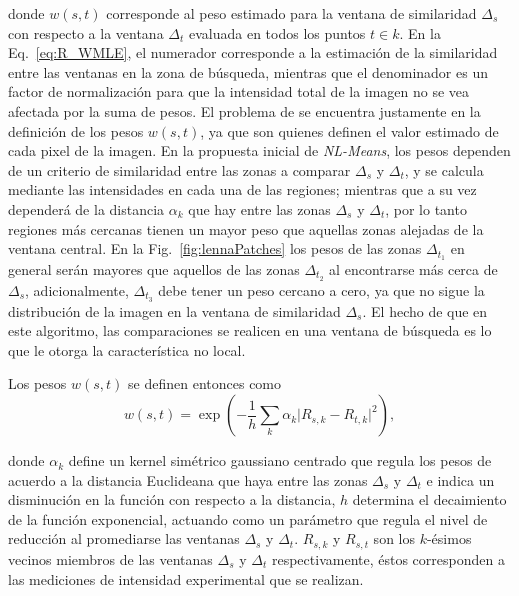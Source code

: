 \noindent donde $w(s,t)$ corresponde al peso estimado para la ventana de similaridad $\Delta_s$ con respecto a la ventana $\Delta_t$ evaluada en todos los puntos $t\in k$. En la Eq.~\ref{eq:R_WMLE}, el numerador corresponde a la estimación de la similaridad entre las ventanas en la zona de búsqueda, mientras que el denominador es un factor de normalización para que la intensidad total de la imagen no se vea afectada por la suma de pesos. El problema de \nlmeans se encuentra justamente en la definición de los pesos $w(s,t)$, ya que son quienes definen el valor estimado de cada pixel de la imagen. En la propuesta inicial de \textit{NL-Means}, los pesos dependen de un criterio de similaridad entre las zonas a comparar $\Delta_s$ y $\Delta_t$, y se calcula mediante las intensidades en cada una de las regiones; mientras que a su vez dependerá de la distancia $\alpha_k$ que hay entre las zonas $\Delta_s$ y $\Delta_t$, por lo tanto regiones más cercanas tienen un mayor peso que aquellas zonas alejadas de la ventana central. En la Fig.~\ref{fig:lennaPatches} los pesos de las zonas $\Delta_{t_1}$ en general serán mayores que aquellos de las zonas $\Delta_{t_2}$ al encontrarse más cerca de $\Delta_s$, adicionalmente, $\Delta_{t_3}$ debe tener un peso cercano a cero, ya que no sigue la distribución de la imagen en la ventana de similaridad $\Delta_s$.  El hecho de que en este algoritmo, las comparaciones se realicen en una ventana de búsqueda es lo que le otorga la característica no local.

Los pesos $w(s,t)$ se definen \cite{Baudes2005} entonces como
\begin{equation}
\label{eq:nlmeans_normal_w}
w(s,t) = \exp\left(-\frac{1}{h} \sum_k \alpha_k \lvert R_{s,k}-R_{t,k} \rvert^2 \right),
\end{equation}

\noindent donde $\alpha_k$ define un kernel simétrico gaussiano centrado que regula los pesos de acuerdo a la distancia Euclideana que haya entre las zonas $\Delta_s$ y $\Delta_t$ e indica un disminución en la función con respecto a la distancia, $h$ determina el decaimiento de la función exponencial, actuando como un parámetro que regula el nivel de reducción al promediarse las ventanas $\Delta_s$ y $\Delta_t$. $R_{s,k}$ y $R_{s,t}$ son los $k$-ésimos vecinos miembros de las ventanas $\Delta_s$ y $\Delta_t$ respectivamente, éstos corresponden a las mediciones de intensidad experimental que se realizan. 

